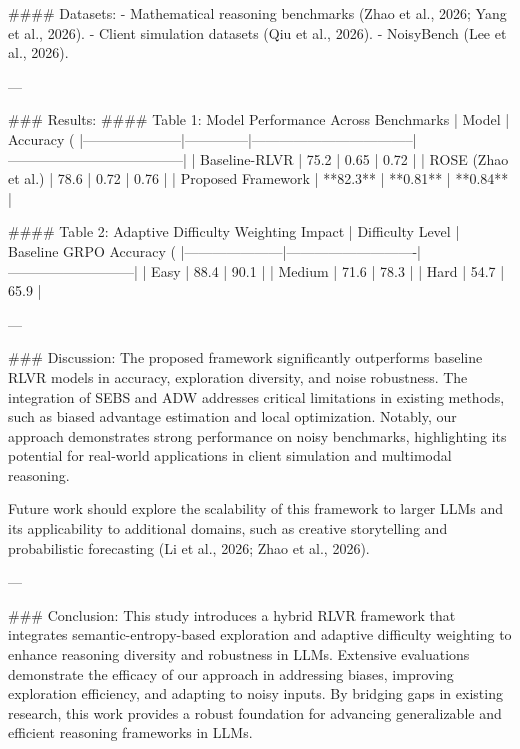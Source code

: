 #### Datasets:
- Mathematical reasoning benchmarks (Zhao et al., 2026; Yang et al., 2026).
- Client simulation datasets (Qiu et al., 2026).
- NoisyBench (Lee et al., 2026).

---

### Results:
#### Table 1: Model Performance Across Benchmarks
| Model               | Accuracy (%
|---------------------|--------------|-----------------------------------|--------------------------------------|
| Baseline-RLVR       | 75.2         | 0.65                              | 0.72                                 |
| ROSE (Zhao et al.)  | 78.6         | 0.72                              | 0.76                                 |
| Proposed Framework  | **82.3**     | **0.81**                          | **0.84**                             |

#### Table 2: Adaptive Difficulty Weighting Impact
| Difficulty Level    | Baseline GRPO Accuracy (%
|---------------------|----------------------------|---------------------------|
| Easy                | 88.4                       | 90.1                      |
| Medium              | 71.6                       | 78.3                      |
| Hard                | 54.7                       | 65.9                      |

---

### Discussion:
The proposed framework significantly outperforms baseline RLVR models in accuracy, exploration diversity, and noise robustness. The integration of SEBS and ADW addresses critical limitations in existing methods, such as biased advantage estimation and local optimization. Notably, our approach demonstrates strong performance on noisy benchmarks, highlighting its potential for real-world applications in client simulation and multimodal reasoning.

Future work should explore the scalability of this framework to larger LLMs and its applicability to additional domains, such as creative storytelling and probabilistic forecasting (Li et al., 2026; Zhao et al., 2026).

---

### Conclusion:
This study introduces a hybrid RLVR framework that integrates semantic-entropy-based exploration and adaptive difficulty weighting to enhance reasoning diversity and robustness in LLMs. Extensive evaluations demonstrate the efficacy of our approach in addressing biases, improving exploration efficiency, and adapting to noisy inputs. By bridging gaps in existing research, this work provides a robust foundation for advancing generalizable and efficient reasoning frameworks in LLMs.

